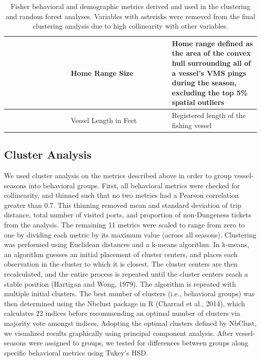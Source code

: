 \documentclass[]{elsarticle} %
\begin{document}
\begin{table} [htbp]
{\begin{tabular}{>{\raggedright\arraybackslash} p{0.25\linewidth} >{\raggedright\arraybackslash}  p{0.4\linewidth}  p{0.5\linewidth}}
    & Home Range Size   & Home range defined as the area of the convex hull surrounding all of a vessel's VMS pings during the season, excluding the top 5\% spatial outliers \\
    \midrule
    \multirow{1}{*}{Vessel Size} & Vessel Length in Feet &  Registered length of the fishing vessel\\
      \bottomrule
   \end{tabular}}
   \caption{Fisher behavioral and demographic metrics derived and used in the clustering and random forest analyses. Variables with asterisks were removed from the final clustering analysis due to high collinearity with other variables.}
   \label{tab:booktabs}
\end{table}

\hypertarget{cluster-analysis}{%
\subsection{Cluster Analysis}\label{cluster-analysis}}

We used cluster analysis on the metrics described above in order to
group vessel-seasons into behavioral groups. First, all behavioral
metrics were checked for collinearity, and thinned such that no two
metrics had a Pearson correlation greater than 0.7. This thinning
removed mean and standard deviation of trip distance, total number of
visited ports, and proportion of non-Dungeness tickets from the
analysis. The remaining 11 metrics were scaled to range from zero to one
by dividing each metric by its maximum value (across all seasons).
Clustering was performed using Euclidean distances and a k-means
algorithm. In k-means, an algorithm guesses an initial placement of
cluster centers, and places each observation in the cluster to which it
is closest. The cluster centers are then recalculated, and the entire
process is repeated until the cluster centers reach a stable position
(Hartigan and Wong, 1979). The algorithm is repeated with multiple
initial clusters. The best number of clusters (i.e., behavioral groups)
was then determined using the Nbclust package in R (Charrad et al.,
2014), which calculates 22 indices before recommending an optimal number
of clusters via majority vote amongst indices. Adopting the optimal
clusters defined by NbClust, we visualized results graphically using
principal component analysis. After vessel-seasons were assigned to
groups, we tested for differences between groups along specific
behavioral metrics using Tukey's HSD.
\end{document}
